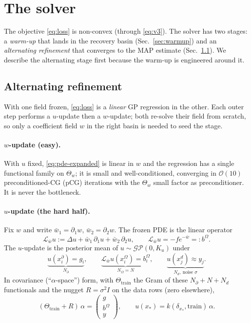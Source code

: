 \documentclass[11pt]{article}
\newcommand{\cGP}{\mathcal{GP}}
\newcommand{\Th}{\Theta}
\newcommand{\Thtr}{\Th_{\mathrm{train}}}
\newcommand{\Lw}{\mathcal{L}_{\bar w}}
\newcommand{\bigO}{\mathcal{O}}
\begin{document}
\section{The solver}\label{sec:solver}

The objective \eqref{eq:loss} is non-convex (through \eqref{eq:v3}). The solver
has two stages: a \emph{warm-up} that lands in the recovery basin
(Sec.~\ref{sec:warmup}) and an \emph{alternating refinement} that converges to
the MAP estimate (Sec.~\ref{sec:alt}). We describe the alternating stage first
because the warm-up is engineered around it.

\subsection{Alternating refinement}\label{sec:alt}

With one field frozen, \eqref{eq:loss} is a \emph{linear} GP regression in the
other. Each outer step performs a $u$-update then a $w$-update; both re-solve
their field from scratch, so only a coefficient field $w$ in the right basin is
needed to seed the stage.

\paragraph{$w$-update (easy).} With $u$ fixed, \eqref{eq:pde-expanded} is linear
in $w$ and the regression has a single functional family on $\Th_w$; it is small
and well-conditioned, converging in $\bigO(10)$ preconditioned-CG (pCG)
iterations with the $\Th_w$ small factor as preconditioner. It is never the
bottleneck.

\paragraph{$u$-update (the hard half).} Fix $w$ and write $\bar w_1=\partial_1
w$, $\bar w_2=\partial_2 w$. The frozen PDE is the linear operator
\begin{equation}
\Lw u := \Delta u + \bar w_1\,\partial_1 u + \bar w_2\,\partial_2 u,
\qquad \Lw u = -f e^{-\bar w} =: b^\Omega .
\end{equation}
The $u$-update is the posterior mean of $u\sim\cGP(0,K_u)$ under
\begin{equation}\label{eq:uconstraints}
\underbrace{u(x_i^\partial)=g_i}_{N_\partial},\qquad
\underbrace{\Lw u(x_i^\Omega)=b_i^\Omega}_{N_\Omega=N},\qquad
\underbrace{u(x_j^d)\approx y_j}_{N_d,\ \text{noise }\sigma}.
\end{equation}
In covariance (``$\alpha$-space'') form, with $\Thtr$ the Gram of these
$N_\partial+N+N_d$ functionals and the nugget $R=\sigma^2 I$ on the data
rows (zero elsewhere),
\begin{equation}\label{eq:alpha}
(\Thtr + R)\,\alpha = \begin{pmatrix}g\\ b^\Omega\\ y\end{pmatrix},
\qquad
u(x_*) = k(\delta_{x_*},\text{train})\,\alpha .
\end{equation}
\end{document}
